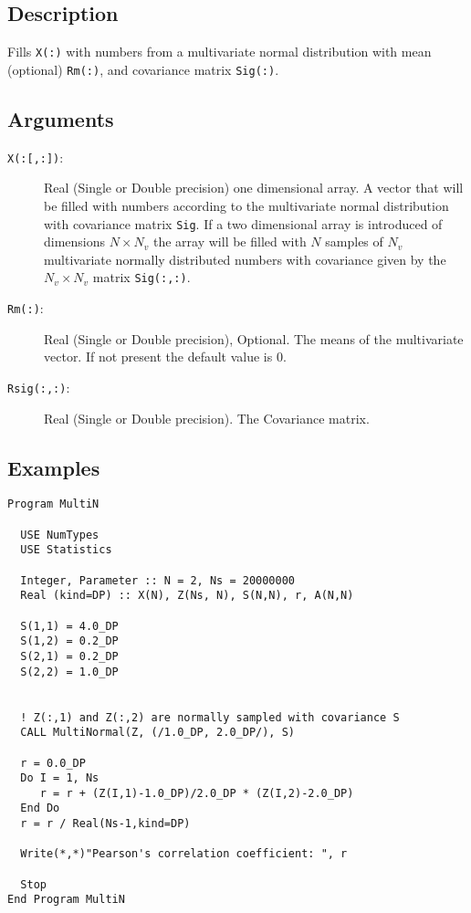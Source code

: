 \subsection{Description}

Fills \texttt{X(:)} with numbers from a multivariate normal
distribution with mean (optional) \texttt{Rm(:)}, and covariance matrix
\texttt{Sig(:)}.

\subsection{Arguments}

\begin{description}
\item[\texttt{X(:[,:])}:] Real (Single or Double precision) one
  dimensional array. A vector that will be filled with numbers
  according to the multivariate normal distribution with covariance
  matrix \texttt{Sig}. If a two dimensional array is introduced of
  dimensions $N\times N_v$ the array will be filled with $N$ samples
  of $N_v$ multivariate normally distributed numbers with covariance
  given by the $N_v\times N_v$ matrix \texttt{Sig(:,:)}.
\item[\texttt{Rm(:)}:] Real (Single or Double precision), Optional. The
  means of the multivariate vector. If not present the default value
  is 0.
\item[\texttt{Rsig(:,:)}:] Real (Single or Double precision). The
  Covariance matrix. 
\end{description}

\subsection{Examples}

\begin{lstlisting}[emph=MultiNormal,
                   emphstyle=\color{blue},
                   frame=trBL,
                   caption=Sampling a multivariate normal distribution.,
                   label=multinormal]
Program MultiN

  USE NumTypes
  USE Statistics

  Integer, Parameter :: N = 2, Ns = 20000000
  Real (kind=DP) :: X(N), Z(Ns, N), S(N,N), r, A(N,N)

  S(1,1) = 4.0_DP
  S(1,2) = 0.2_DP
  S(2,1) = 0.2_DP
  S(2,2) = 1.0_DP


  ! Z(:,1) and Z(:,2) are normally sampled with covariance S
  CALL MultiNormal(Z, (/1.0_DP, 2.0_DP/), S)

  r = 0.0_DP
  Do I = 1, Ns
     r = r + (Z(I,1)-1.0_DP)/2.0_DP * (Z(I,2)-2.0_DP)
  End Do
  r = r / Real(Ns-1,kind=DP)
  
  Write(*,*)"Pearson's correlation coefficient: ", r

  Stop
End Program MultiN
\end{lstlisting}



